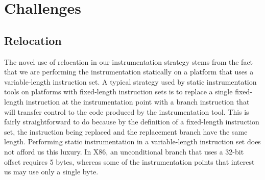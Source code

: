 \section{Challenges}

\subsection{Relocation}
The novel use of relocation in our instrumentation strategy stems from the fact that we are performing
the instrumentation statically on a platform that uses a variable-length instruction
set. A typical strategy used by static instrumentation tools on platforms with 
fixed-length instruction sets is to replace a single fixed-length instruction at 
the instrumentation point with a branch instruction that will transfer control to 
the code produced by the instrumentation tool. This is fairly straightforward to
do because by the definition of a fixed-length instruction set,
the instruction being replaced and the replacement branch have the same length. Performing
static instrumentation in a variable-length instruction set does not afford us this luxury.
In X86, an unconditional branch that uses a 32-bit offset requires 5 bytes, whereas some
of the instrumentation points that interest us may use only a single byte.

